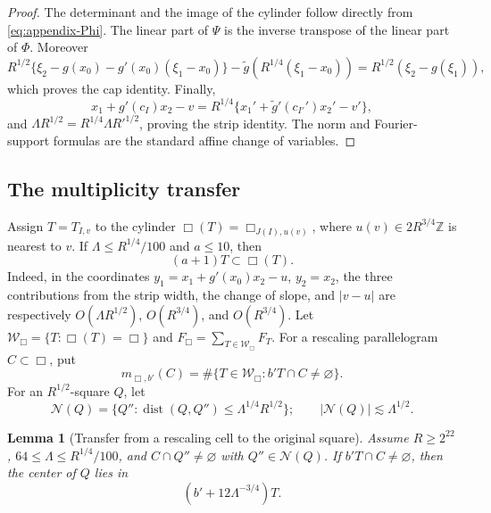 \documentclass[11pt,letterpaper]{amsart}
\newtheorem{lemma}[lemma]{Lemma}
\newcommand{\dist}{\operatorname{dist}}
\begin{document}
\begin{proof}
The determinant and the image of the cylinder follow directly from
\eqref{eq:appendix-Phi}.  The linear part of $\Psi$ is the inverse transpose
of the linear part of $\Phi$.  Moreover
\[
 R^{1/2}\{\xi_2-g(x_0)-g'(x_0)(\xi_1-x_0)\}
 -\widetilde g(R^{1/4}(\xi_1-x_0))
 =R^{1/2}(\xi_2-g(\xi_1)),
\]
which proves the cap identity.  Finally,
\[
 x_1+g'(c_I)x_2-v
 =R^{1/4}\{x_1'+\widetilde g'(c_{I'}')x_2'-v'\},
\]
and $\Lambda R^{1/2}=R^{1/4}\Lambda R'^{1/2}$, proving the strip identity.
The norm and Fourier-support formulas are the standard affine change of
variables.
\end{proof}

\subsection{The multiplicity transfer}

Assign $T=T_{I,v}$ to the cylinder $\Box(T)=\Box_{J(I),u(v)}$, where
$u(v)\in2R^{3/4}\mathbb Z$ is nearest to $v$.  If
$\Lambda\le R^{1/4}/100$ and $a\le10$, then
\begin{equation}\label{eq:aT-in-box}
 (a+1)T\subset\Box(T).
\end{equation}
Indeed, in the coordinates
$y_1=x_1+g'(x_0)x_2-u$, $y_2=x_2$, the three contributions from the strip
width, the change of slope, and $|v-u|$ are respectively
$O(\Lambda R^{1/2})$, $O(R^{3/4})$, and $O(R^{3/4})$.
Let $\mathcal W_\Box=\{T:\Box(T)=\Box\}$ and
$F_\Box=\sum_{T\in\mathcal W_\Box}F_T$.
For a rescaling parallelogram $C\subset\Box$, put
\[
 m_{\Box,b'}(C)=\#\{T\in\mathcal W_\Box:b'T\cap C\ne\varnothing\}.
\]
For an $R^{1/2}$-square $Q$, let
\[
 \mathcal N(Q)=\{Q'':\dist(Q,Q'')\le\Lambda^{1/4}R^{1/2}\};
 \qquad |\mathcal N(Q)|\lesssim\Lambda^{1/2}.
\]

\begin{lemma}[Transfer from a rescaling cell to the original square]
\label{lem:appendix-transfer}
Assume $R\ge2^{22}$, $64\le\Lambda\le R^{1/4}/100$, and
$C\cap Q''\ne\varnothing$ with $Q''\in\mathcal N(Q)$.  If
$b'T\cap C\ne\varnothing$, then the center of $Q$ lies in
\[
 (b'+12\Lambda^{-3/4})T.
\]
\end{lemma}
\end{document}
